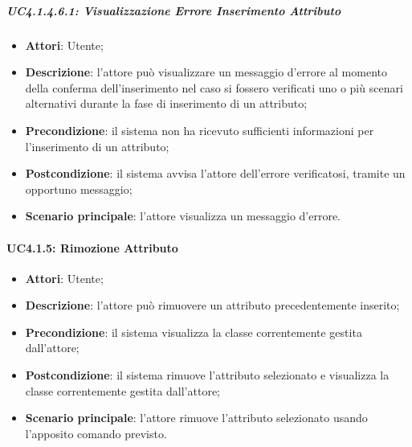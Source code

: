 \subparagraph{UC4.1.4.6.1: Visualizzazione Errore Inserimento Attributo}
\label{UC4.1.4.6.1}
\begin{itemize}
	\item \textbf{Attori}: Utente;
	\item \textbf{Descrizione}: l'attore può visualizzare un messaggio d'errore al momento della conferma dell'inserimento nel caso si fossero verificati uno o più scenari alternativi durante la fase di inserimento di un attributo;
	\item \textbf{Precondizione}: il sistema non ha ricevuto sufficienti informazioni per l'inserimento di un attributo;
	\item \textbf{Postcondizione}: il sistema avvisa l'attore dell'errore verificatosi, tramite un opportuno messaggio;
	\item \textbf{Scenario principale}: l'attore visualizza un messaggio d'errore.
\end{itemize}

\paragraph{UC4.1.5: Rimozione Attributo}
\label{UC4.1.5}
\begin{itemize}
	\item \textbf{Attori}: Utente;
	\item \textbf{Descrizione}: l'attore può rimuovere un attributo precedentemente inserito;
	\item \textbf{Precondizione}: il sistema visualizza la classe correntemente gestita dall'attore;
	\item \textbf{Postcondizione}: il sistema rimuove l'attributo selezionato e visualizza la classe correntemente gestita dall'attore;
	\item \textbf{Scenario principale}: l'attore rimuove l'attributo selezionato usando l'apposito comando previsto.
\end{itemize}

